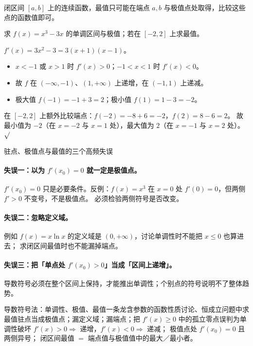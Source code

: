 \begin{explore}
闭区间 $[a,b]$ 上的连续函数，最值只可能在端点 $a,b$ 与极值点处取得，比较这些点的函数值即可。

\begin{example}
求 $f(x)=x^3-3x$ 的单调区间与极值；若在 $[-2,2]$ 上求最值。
\end{example}
\begin{solution}
$f'(x)=3x^2-3=3(x+1)(x-1)$。
\begin{itemize}
  \item $x<-1$ 或 $x>1$ 时 $f'(x)>0$；$-1<x<1$ 时 $f'(x)<0$。
  \item 故 $f$ 在 $(-\infty,-1)$、$(1,+\infty)$ 上递增，在 $(-1,1)$ 上递减。
  \item 极大值 $f(-1)=-1+3=2$；极小值 $f(1)=1-3=-2$。
\end{itemize}
在 $[-2,2]$ 上额外比较端点：$f(-2)=-8+6=-2$，$f(2)=8-6=2$。
故最小值为 $-2$（在 $x=-2$ 与 $x=1$ 处），最大值为 $2$（在 $x=-1$ 与 $x=2$ 处）。
$\surd$
\end{solution}

\begin{commonerror}{驻点、极值点与最值的三个高频失误}
\paragraph{失误一：以为 $f'(x_0)=0$ 就一定是极值点。}
$f'(x_0)=0$ 只是必要条件。反例：$f(x)=x^3$ 在 $x=0$ 处 $f'(0)=0$，但两侧 $f'>0$ 不变号，不是极值点。
必须检验两侧符号是否改变。
\paragraph{失误二：忽略定义域。}
例如 $f(x)=x\ln x$ 的定义域是 $(0,+\infty)$，讨论单调性时不能把 $x\le0$ 也算进去；
求闭区间最值时也不能漏掉端点。
\paragraph{失误三：把「单点处 $f'(x_0)>0$」当成「区间上递增」。}
导数符号必须在整个区间上保持，才能推出单调性；个别点的符号说明不了整体趋势。
\end{commonerror}

\begin{conccard}[一级]{导数符号法：单调性、极值、最值一条龙}{含参数的函数性质讨论、恒成立问题中求最值}{驻点当成极值点；漏定义域；漏端点；把 $f'(x)\ge0$ 中的孤立零点误判为单调性破坏}
$f'(x)>0\Rightarrow$ 递增，$f'(x)<0\Rightarrow$ 递减；
极值点处 $f'(x_0)=0$ 且两侧异号；
闭区间最值 $=$ 端点值与极值值中的最大／最小者。
\end{conccard}


\end{explore}
